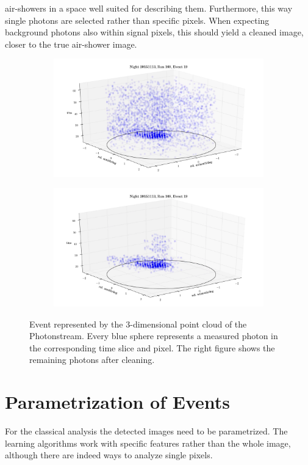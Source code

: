 air-showers in a space well suited for describing them. Furthermore, this way
single photons are selected rather than specific pixels. When expecting
background photons also within signal pixels, this should yield a cleaned image,
closer to the true air-shower image.
%
\begin{figure}
  \begin{subfigure}{0.5\textwidth}
    \centering
    \includegraphics[width=1.1\textwidth]{Plots/event2.png}
  \end{subfigure}
  \begin{subfigure}{0.5\textwidth}
    \centering
    \includegraphics[width=1.1\textwidth]{Plots/event1.png}
  \end{subfigure}
  \caption{Event represented by the 3-dimensional point cloud of the Photonstream. Every blue sphere represents a measured photon in the corresponding time slice and pixel. The right figure shows the remaining photons after cleaning.}
  \label{fig:event}
\end{figure}
%

\section{Parametrization of Events}
%
For the classical analysis the detected images need to be parametrized. The
learning algorithms work with specific features rather than the whole image,
although there are indeed ways to analyze single pixels.

